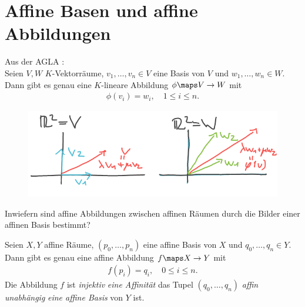 \section*{Affine Basen und affine Abbildungen}
Aus der AGLA :\\
Seien \( V,W \) \( K \)-Vektorräume, \( v_1,\dotsc, v_n \in V \) eine Basis von \( V \) und \( w_1,\dotsc, w_n \in W\). Dann gibt es genau eine \( K \)-lineare Abbildung \( \phi\maps V\to W \) mit
\begin{align*}
    \phi(v_i)=w_i,\quad 1\leq i \leq n.
\end{align*}
\begin{figure}[H]
    \centering
    \includegraphics[width=0.7\linewidth]{figures/bilder_der_basen_bestimmt_abbildung_r_2}
    \label{fig:bilder_der_basen_bestimmt_abbildung_r_2}
\end{figure}
\begin{frage*}
    Inwiefern sind affine Abbildungen zwischen affinen Räumen durch die Bilder einer affinen Basis bestimmt?
\end{frage*}
\begin{satz}\label{bilder_der_basen_bestimmen_affine_abbildung}
    Seien \( X,Y \) affine Räume, \( (p_0,\dotsc,p_n) \) eine affine Basis von \( X \) und \( q_0,\dotsc, q_n\in Y \). Dann gibt es genau eine affine Abbildung \( f\maps X\to Y \) mit
    \begin{align*}
        f(p_i)=q_i,\quad 0\leq i\leq n.
    \end{align*}
    Die Abbildung \( f \) ist \emph{injektiv} \bzw \emph{eine Affinität} \gdw das Tupel \( (q_0,\dotsc, q_n) \) \emph{affin unabhängig} \bzw \emph{eine affine Basis} von \( Y \) ist.
\end{satz}
